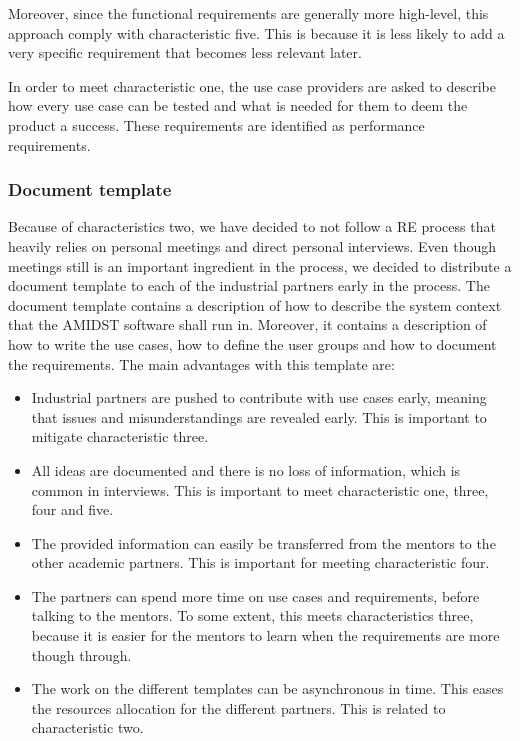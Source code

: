 \documentclass[11pt, oneside]{article}   	%
\begin{document}
Moreover, since the functional requirements are generally more high-level, this approach comply with characteristic five.  This is because it is less likely to add a very specific requirement that becomes less relevant later.  

In order to meet characteristic one, the use case providers are asked to describe how every use case can be tested and what is needed for them to deem the product a success.  These requirements are identified as performance requirements.

\subsubsection*{Document template}

Because of characteristics two, we have decided to not follow a RE process that heavily relies on personal meetings and direct personal interviews.  Even though meetings still is an important ingredient in the process, we decided to distribute a document template to each of the industrial partners early in the process. The document template contains a description of how to describe the system context that the AMIDST software shall run in.  Moreover, it contains a description of how to write the use cases, how to define the user groups and how to document the requirements.
The main advantages with this template are:

\begin{itemize}
\item Industrial partners are pushed to contribute with use cases early, meaning that issues and misunderstandings are revealed early.  This is important to mitigate characteristic three.
\item All ideas are documented and there is no loss of information, which is common in interviews.  This is important to meet characteristic one, three, four and five.
\item The provided information can easily be transferred from the mentors to the other academic partners.  This is important for meeting characteristic four.
\item  The partners can spend more time on use cases and requirements, before talking to the mentors.  To some extent, this meets characteristics three, because it is easier for the mentors to learn when the requirements are more though through.
\item The work on the different templates can be asynchronous in time.  This eases the resources allocation for the different partners.  This is related to characteristic two.
\end{itemize}
\end{document}

